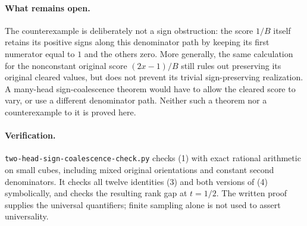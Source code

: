 \documentclass[11pt]{article}
\begin{document}
\paragraph{What remains open.}
The counterexample is deliberately not a sign obstruction: the score
$1/B$ itself retains its positive signs along this denominator path by
keeping its first numerator equal to $1$ and the others zero. More
generally, the same calculation for the nonconstant original score
$(2x-1)/B$ still rules out preserving its original cleared values, but
does not prevent its trivial sign-preserving realization. A many-head
sign-coalescence theorem would have to allow the cleared score to vary,
or use a different denominator path. Neither such a theorem nor a
counterexample to it is proved here.

\paragraph{Verification.}
\texttt{two-head-sign-coalescence-check.py} checks (1) with exact rational
arithmetic on small cubes, including mixed original orientations and
constant second denominators. It checks all twelve identities (3) and
both versions of (4) symbolically, and checks the resulting rank gap at
$t=1/2$. The written proof supplies the universal quantifiers; finite
sampling alone is not used to assert universality.
\end{document}
